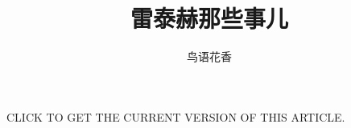 \documentclass{hitec}
\title{雷泰赫那些事儿}
\author{鸟语花香}
\begin{document}
\maketitle

CLICK \href{https://github.com/yangdaweihit/latexreport}{}
TO GET THE CURRENT VERSION OF THIS ARTICLE.

\linenumbers









\end{document}

